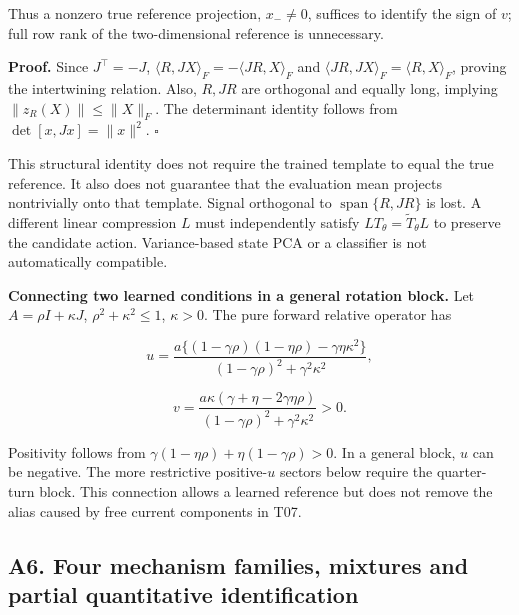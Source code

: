 \documentclass[11pt,a4paper]{article}
\begin{document}
Thus a nonzero true reference projection, \(x_-\ne0\), suffices to
identify the sign of \(v\); full row rank of the two-dimensional
reference is unnecessary.

\textbf{Proof.} Since \(J^\top=-J\),
\(\langle R,JX\rangle_F=-\langle JR,X\rangle_F\) and
\(\langle JR,JX\rangle_F=\langle R,X\rangle_F\), proving the
intertwining relation. Also, \(R,JR\) are orthogonal and equally long,
implying \(\|z_R(X)\|\le\|X\|_F\). The determinant identity follows from
\(\det[x,Jx]=\|x\|^2\). \(\square\)

This structural identity does not require the trained template to equal
the true reference. It also does not guarantee that the evaluation mean
projects nontrivially onto that template. Signal orthogonal to
\(\operatorname{span}\{R,JR\}\) is lost. A different linear compression
\(L\) must independently satisfy \(LT_\theta=\widetilde T_\theta L\) to
preserve the candidate action. Variance-based state PCA or a classifier
is not automatically compatible.

\par
\noindent\begin{minipage}{\linewidth}

\textbf{Connecting two learned conditions in a general rotation block.}
Let \(A=\rho I+\kappa J\), \(\rho^2+\kappa^2\le1\), \(\kappa>0\). The
pure forward relative operator has

\[
u=\frac{a\{(1-\gamma\rho)(1-\eta\rho)-\gamma\eta\kappa^2\}}
{(1-\gamma\rho)^2+\gamma^2\kappa^2},
\]

\end{minipage}\par

\[
v=\frac{a\kappa(\gamma+\eta-2\gamma\eta\rho)}
{(1-\gamma\rho)^2+\gamma^2\kappa^2}>0.
\]

Positivity follows from \(\gamma(1-\eta\rho)+\eta(1-\gamma\rho)>0\). In
a general block, \(u\) can be negative. The more restrictive
positive-\(u\) sectors below require the quarter-turn block. This
connection allows a learned reference but does not remove the alias
caused by free current components in T07.

\subsection{A6. Four mechanism families, mixtures and partial
quantitative
identification}\label{a6.-four-mechanism-families-mixtures-and-partial-quantitative-identification}
\end{document}
